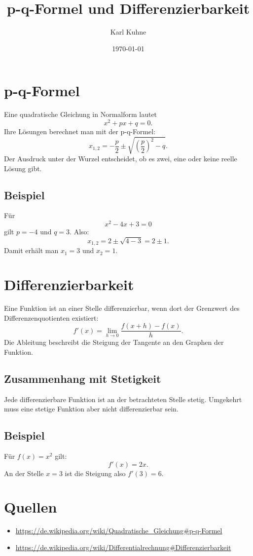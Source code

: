 \documentclass{article}
\title{p-q-Formel und Differenzierbarkeit}
\author{Karl Kuhne}
\date{\today}
\begin{document}
\maketitle

\section{p-q-Formel}
Eine quadratische Gleichung in Normalform lautet
\[
  x^2 + px + q = 0.
\]
Ihre Lösungen berechnet man mit der p-q-Formel:
\[
  x_{1,2} = -\frac{p}{2} \pm \sqrt{\left(\frac{p}{2}\right)^2 - q}.
\]
Der Ausdruck unter der Wurzel entscheidet, ob es zwei, eine oder keine reelle Lösung gibt.

\subsection{Beispiel}
Für
\[
  x^2 - 4x + 3 = 0
\]
gilt $p=-4$ und $q=3$. Also:
\[
  x_{1,2}=2 \pm \sqrt{4-3}=2 \pm 1.
\]
Damit erhält man $x_1=3$ und $x_2=1$.

\section{Differenzierbarkeit}
Eine Funktion ist an einer Stelle differenzierbar, wenn dort der Grenzwert des Differenzenquotienten existiert:
\[
  f'(x)=\lim_{h\to 0}\frac{f(x+h)-f(x)}{h}.
\]
Die Ableitung beschreibt die Steigung der Tangente an den Graphen der Funktion.

\subsection{Zusammenhang mit Stetigkeit}
Jede differenzierbare Funktion ist an der betrachteten Stelle stetig. Umgekehrt muss eine stetige Funktion aber nicht differenzierbar sein.

\subsection{Beispiel}
Für $f(x)=x^2$ gilt:
\[
  f'(x)=2x.
\]
An der Stelle $x=3$ ist die Steigung also $f'(3)=6$.

\section*{Quellen}
\begin{itemize}
  \item \url{https://de.wikipedia.org/wiki/Quadratische_Gleichung#p-q-Formel}
  \item \url{https://de.wikipedia.org/wiki/Differentialrechnung#Differenzierbarkeit}
\end{itemize}
\end{document}
